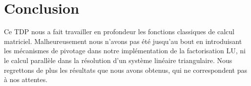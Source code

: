 \section*{Conclusion}

Ce TDP nous a fait travailler en profondeur les fonctions classiques de calcul matriciel. Malheureusement nous n'avons pas été jusqu'au bout en introduisant les mécanismes de pivotage dans notre implémentation de la factorisation LU, ni le calcul parallèle dans la résolution d'un système linéaire triangulaire. Nous regrettons de plus les résultats que nous avons obtenus, qui ne correspondent pas à nos attentes.